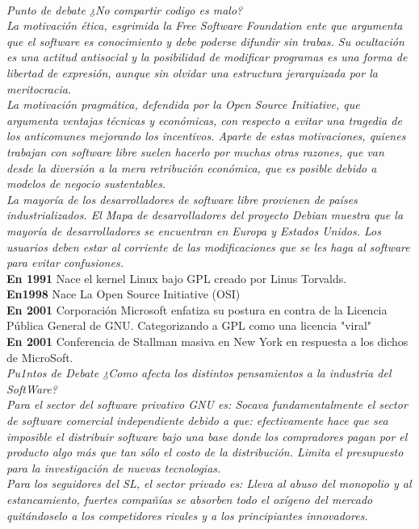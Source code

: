 \documentclass{book}
\begin{document}
\\
{\it Punto de debate ¿No compartir codigo es malo?
\\
La motivación ética, esgrimida la Free Software Foundation ente que argumenta que el software es conocimiento y debe poderse difundir sin trabas. Su ocultación es una actitud antisocial y la posibilidad de modificar programas es una forma de libertad de expresión, aunque sin olvidar una estructura jerarquizada por la meritocracia.
\\
La motivación pragmática, defendida por la Open Source Initiative, que argumenta ventajas técnicas y económicas, con respecto a evitar una tragedia de los anticomunes mejorando los incentivos.
Aparte de estas motivaciones, quienes trabajan con software libre suelen hacerlo por muchas otras razones, que van desde la diversión a la mera retribución económica, que es posible debido a modelos de negocio sustentables.
\\
La mayoría de los desarrolladores de software libre provienen de países industrializados. El Mapa de desarrolladores del proyecto Debian muestra que la mayoría de desarrolladores se encuentran en Europa y Estados Unidos.
Los usuarios deben estar al corriente de las modificaciones que se les haga al software para evitar confusiones.
}
\\
{\bf En 1991} Nace el kernel Linux bajo  GPL creado por Linus Torvalds.
\\
{\bf En1998} Nace La Open Source Initiative (OSI)
\\
{\bf En 2001} Corporación Microsoft enfatiza su postura en contra de la Licencia Pública General de GNU.
Categorizando a GPL como una licencia "viral"
\\
{\bf En 2001} Conferencia de Stallman masiva en New York en respuesta a los dichos de MicroSoft.
\\
{\it Pu1ntos de Debate ¿Como afecta los distintos pensamientos a la industria del SoftWare?
\\
\emph{Para el sector del software privativo GNU es:}
Socava fundamentalmente el sector de software comercial independiente debido a que: efectivamente hace que sea imposible el distribuir software bajo una base donde los compradores pagan por el producto algo más que tan sólo el costo de la distribución.
Limita el presupuesto para la investigación de nuevas tecnologias.
\\
\emph{Para los seguidores del SL, el sector privado es:}
Lleva al abuso del monopolio y al estancamiento, fuertes compañías se absorben todo el oxígeno del mercado quitándoselo a los competidores rivales y a los principiantes innovadores.
}
\end{document}
